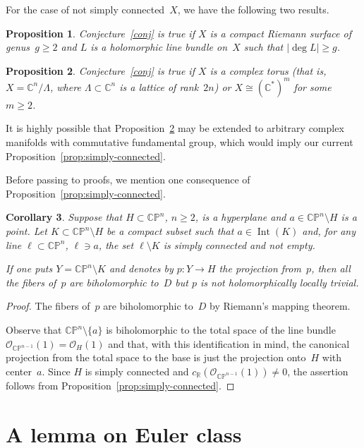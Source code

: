 \documentclass[11pt]{amsart}
\newcommand*{\C}{{\mathbb C}}
\newcommand*{\Oo}{{\mathcal O}}
\newcommand*{\CP}{{\mathbb {CP}}}
\newcommand*{\R}{{\mathbb R}}
\DeclareMathOperator{\Int}{Int}
\newtheorem{proposition}{Proposition}[section]
\newtheorem{corollary}[proposition]{Corollary}
\theoremstyle{remark}
\theoremstyle{definition}
\begin{document}
For the case of not simply connected~$X$, we have the following two results.

\begin{proposition}\label{Milnor_style}
Conjecture~\ref{conj} is true if $X$ is a compact Riemann surface of
genus~$g\ge 2$ 
and $L$ is a holomorphic line bundle on~$X$ such that ${|\deg L|\ge g}$.   
\end{proposition}

\begin{proposition}\label{tori}
Conjecture~\ref{conj} is true if $X$ is a complex torus \textup(that
is, $X=\C^n/\Lambda$, where $\Lambda\subset\C^n$ is a lattice of
rank~$2n$\textup) or $X\cong(\C^*)^m$ for some~$m\ge2$.
\end{proposition}

It is highly possible that Proposition~\ref{tori} may be extended to
arbitrary complex manifolds with commutative fundamental group, which
would imply our current Proposition~\ref{prop:simply-connected}.

Before passing to proofs, we mention one consequence of
Proposition~\ref{prop:simply-connected}. 

\begin{corollary}
Suppose that $H\subset\CP^n$, $n\ge2$, is a hyperplane and
$a\in\CP^n\setminus H$ is a
point. Let $K\subset\CP^n\setminus H$  be a compact subset such that
$a\in\Int(K)$ and, for
any line $\ell\subset\CP^n$, $\ell\ni a$, the set
$\ell\setminus K$ is
simply connected and not empty.

If one puts $Y=\CP^n\setminus K$ and denotes by $p\colon Y\to H$ the
projection from~$p$, then all the fibers of~$p$  are biholomorphic
to~$D$ but $p$ is not holomorphically locally trivial.
\end{corollary}

\begin{proof}
The fibers of~$p$ are biholomorphic to~$D$ by Riemann's mapping theorem.
  
Observe that $\CP^n\setminus\{a\}$ is biholomorphic to the total space of
the line bundle $\Oo_{\CP^{n-1}}(1)=\Oo_H(1)$ and that, with this
identification in mind, the canonical projection from the total space
to the base is just the projection onto~$H$ with center~$a$. Since
$H$ is simply connected and $c_\R(\Oo_{\CP^{n-1}}(1))\ne 0$, the
assertion follows from Proposition~\ref{prop:simply-connected}.
\end{proof}

\section{A lemma on Euler class}
\end{document}
